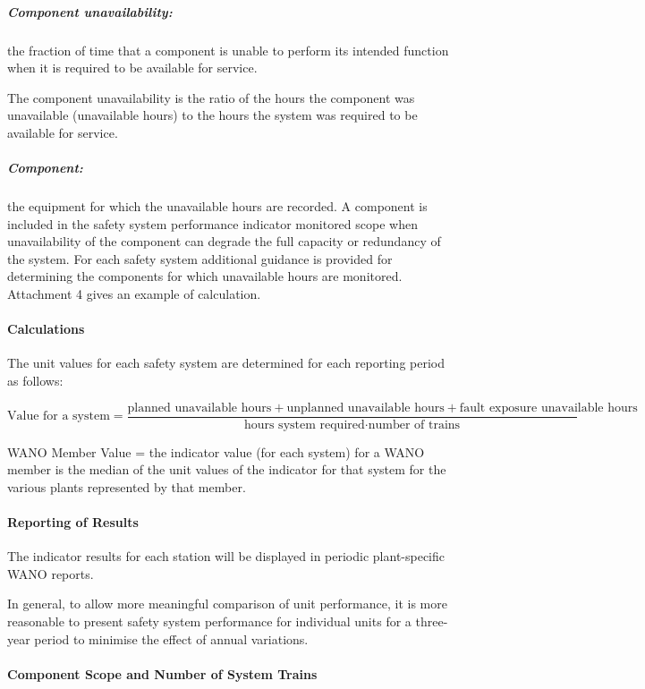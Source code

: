 \subparagraph{Component unavailability:} the fraction of time that a
component is unable to perform its intended function when it is
required to be available for service.

The component unavailability is the ratio of the hours the component
was unavailable (unavailable hours) to the hours the system was
required to be available for service.

\subparagraph{Component:} the equipment for which the unavailable hours are recorded.
A component is included in the safety system performance indicator
monitored scope when unavailability of the component can degrade the
full capacity or redundancy of the system. For each safety system
additional guidance is provided for determining the components for
which unavailable hours are monitored. Attachment 4 gives an example
of calculation.

\paragraph{Calculations}

The unit values for each safety system are determined for each
reporting period as follows:

$$ \text{Value for a system} = \frac{\text{planned unavailable
    hours}+\text{unplanned unavailable hours}+\text{fault exposure unavailable hours}}{\text{hours system required} \cdot \text{number of trains}} $$

WANO Member Value = the indicator value (for each system) for a WANO
member is the median of the unit values of the indicator for that
system for the various plants represented by that member.

\paragraph{Reporting of Results}

The indicator results for each station will be displayed in periodic
plant-specific WANO reports.

In general, to allow more meaningful comparison of unit performance,
it is more reasonable to present safety system performance for
individual units for a three-year period to minimise the effect of
annual variations.

\paragraph{Component Scope and Number of System Trains}

